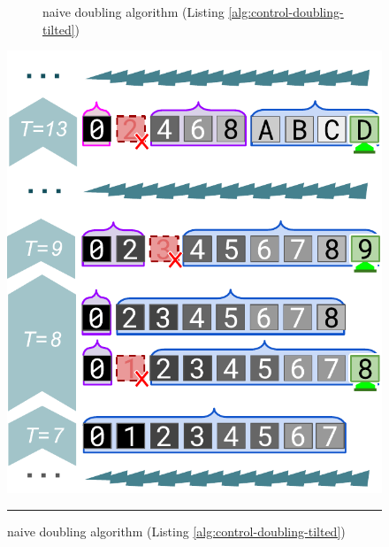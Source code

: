 \begin{figure}
\begin{subfigure}{0.33\linewidth}
\centering
\caption{naive doubling algorithm (Listing \ref{alg:control-doubling-tilted})}
\label{fig:surface-control-tilted:naive-doubling}
\end{subfigure}
\begin{minipage}{0.63\linewidth}
\centering
\includegraphics[width=\linewidth]{img/surface-control-tilted-saturating-bucket}
\end{minipage}

\vspace{1ex}

\noindent\rule{\linewidth}{1pt}

\vspace{1ex}


\end{figure}
